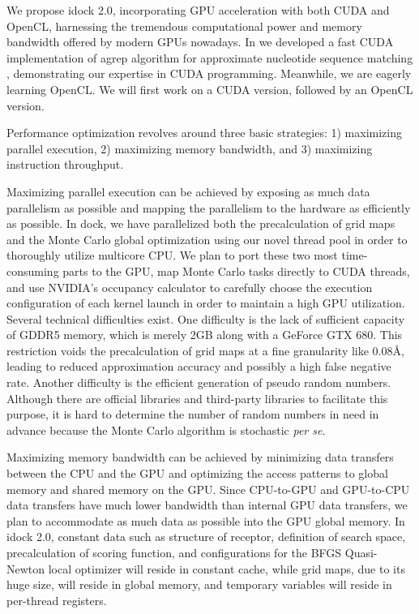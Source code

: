 We propose idock 2.0, incorporating GPU acceleration with both CUDA and OpenCL, harnessing the tremendous computational power and memory bandwidth offered by modern GPUs nowadays. In \citeyear{1138} we developed a fast CUDA implementation of agrep algorithm for approximate nucleotide sequence matching \citep{1138}, demonstrating our expertise in CUDA programming. Meanwhile, we are eagerly learning OpenCL. We will first work on a CUDA version, followed by an OpenCL version.

Performance optimization revolves around three basic strategies: 1) maximizing parallel execution, 2) maximizing memory bandwidth, and 3) maximizing instruction throughput.

Maximizing parallel execution can be achieved by exposing as much data parallelism as possible and mapping the parallelism to the hardware as efficiently as possible. In dock, we have parallelized both the precalculation of grid maps and the Monte Carlo global optimization using our novel thread pool in order to thoroughly utilize multicore CPU. We plan to port these two most time-consuming parts to the GPU, map Monte Carlo tasks directly to CUDA threads, and use NVIDIA's occupancy calculator to carefully choose the execution configuration of each kernel launch in order to maintain a high GPU utilization. Several technical difficulties exist. One difficulty is the lack of sufficient capacity of GDDR5 memory, which is merely 2GB along with a GeForce GTX 680. This restriction voids the precalculation of grid maps at a fine granularity like 0.08\AA, leading to reduced approximation accuracy and possibly a high false negative rate. Another difficulty is the efficient generation of pseudo random numbers. Although there are official libraries and third-party libraries to facilitate this purpose, it is hard to determine the number of random numbers in need in advance because the Monte Carlo algorithm is stochastic \textit{per se}.

Maximizing memory bandwidth can be achieved by minimizing data transfers between the CPU and the GPU and optimizing the access patterns to global memory and shared memory on the GPU. Since CPU-to-GPU and GPU-to-CPU data transfers have much lower bandwidth than internal GPU data transfers, we plan to accommodate as much data as possible into the GPU global memory. In idock 2.0, constant data such as structure of receptor, definition of search space, precalculation of scoring function, and configurations for the BFGS Quasi-Newton local optimizer will reside in constant cache, while grid maps, due to its huge size, will reside in global memory, and temporary variables will reside in per-thread registers.

